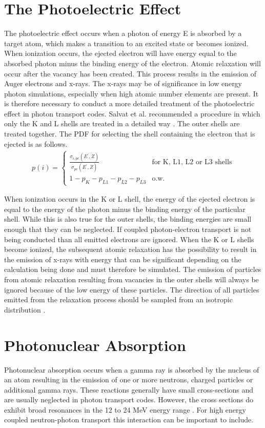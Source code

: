 \section{The Photoelectric Effect}
The photoelectric effect occurs when a photon of energy E is absorbed by a
target atom, which makes a transition to an excited state or becomes ionized.
When ionization occurs, the ejected electron will have energy equal to the 
absorbed photon minus the binding energy of the electron. Atomic relaxation
will occur after the vacancy has been created. This process results in the 
emission of Auger electrons and x-rays. The x-rays may be of significance in
low energy photon simulations, especially when high atomic number elements are
present. It is therefore necessary to conduct a more detailed treatment of the
photoelectric effect in photon transport codes. Salvat et al. recommended a 
procedure in which only the K and L shells are treated in a detailed way
\citep{salvat_physics_2001}. The outer shells are treated together. The PDF
for selecting the shell containing the electron that is ejected is as follows.
\begin{align}
  p(i) = 
  \begin{cases}
    \frac{\sigma_{i,pe}(E^{'},Z)}{\sigma_{pe}(E^{'},Z)} & \text{for K, L1, L2 or L3 shells} \\
    1 - p_K - p_{L1} - p_{L2} - p_{L3} & \text{o.w.}
  \end{cases}
\end{align}

When ionization occurs in the K or L shell, the energy of the ejected electron
is equal to the energy of the photon minus the binding energy of the particular
shell. While this is also true for the outer shells, the binding energies are
small enough that they can be neglected. If coupled photon-electron transport
is not being conducted than all emitted electrons are ignored. When the K or
L shells become ionized, the subsequent atomic relaxation has the possibility
to result in the emission of x-rays with energy that can be significant
depending on the calculation being done and must therefore be simulated. The
emission of particles from atomic relaxation resulting from vacancies in the
outer shells will always be ignored because of the low energy of these 
particles. The direction of all particles emitted from the relaxation process
should be sampled from an isotropic distribution \citep{salvat_physics_2001}.

\section{Photonuclear Absorption}
Photonuclear absorption occurs when a gamma ray is absorbed by the nucleus of
an atom resulting in the emission of one or more neutrons, charged particles or
additional gamma rays. These reactions generally have small cross-sections
and are usually neglected in photon transport codes. However, the cross sections
do exhibit broad resonances in the 12 to 24 MeV energy range 
\citep{lux_monte_1991}. For high energy coupled neutron-photon transport this
interaction can be important to include. 

